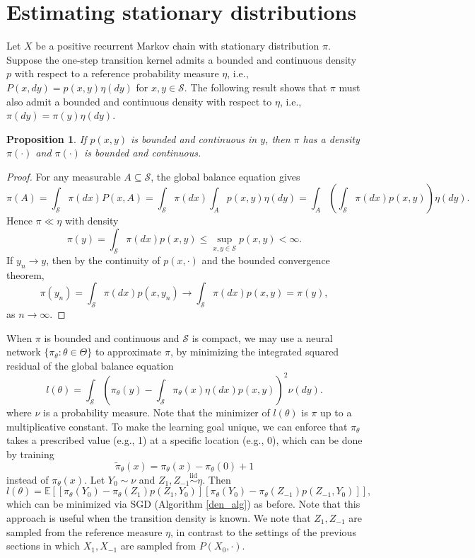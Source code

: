 \documentclass[pdflatex,sn-mathphys-ay]{sn-jnl}%
\numberwithin{equation}{section}
\newcommand\prs[1]{\left(#1\right)}
\newcommand\sbk[1]{\left[#1\right]}
\newcommand{\E}{\mathbb{E}}
\newcommand{\Scal}{\mathcal{S}}
\newcommand{\gti}{\rightarrow\infty}
\theoremstyle{thmstyleone}%
\newtheorem{proposition}[theorem]{Proposition}%
\theoremstyle{thmstyletwo}%
\theoremstyle{thmstylethree}%
\begin{document}
\section{Estimating stationary distributions}
\label{stationary_section}
Let $X$ be a positive recurrent Markov chain with stationary distribution $\pi$. Suppose the one-step transition kernel admits a bounded and continuous density $p$ with respect to a reference probability measure $\eta$, i.e., $P(x,dy)=p(x,y)\eta(dy)$ for $x,y\in\Scal$. The following result shows that $\pi$ must also admit a bounded and continuous density with respect to $\eta$, i.e., $\pi(dy)=\pi(y)\eta(dy)$. 
\begin{proposition}
\label{density_proposition}
If $p(x,y)$ is bounded and continuous in $y$, then $\pi$ has a density $\pi(\cdot)$ and $\pi(\cdot)$ is bounded and continuous.
\end{proposition}
\begin{proof}
    For any measurable $A\subseteq\Scal$, the global balance equation gives
    \[
    \pi(A)=\int_\Scal\pi(dx)P(x,A)=\int_\Scal\pi(dx)\int_A p(x,y)\eta(dy)=\int_A\prs{\int_\Scal\pi(dx)p(x,y)}\eta(dy).
    \]
    Hence $\pi\ll\eta$ with density
    \[
    \pi(y)=\int_\Scal\pi(dx)p(x,y)\leq\sup_{x,y\in\Scal}p(x,y)<\infty.
    \]
    If $y_n\rightarrow y$, then by the continuity of $p(x,\cdot)$ and the bounded convergence theorem,
    \[
    \pi(y_n)=\int_\Scal\pi(dx)p(x,y_n)\rightarrow\int_\Scal\pi(dx)p(x,y)=\pi(y),
    \]
    as $n\gti.$
\end{proof}
When $\pi$ is bounded and continuous and $\Scal$ is compact, we may use a neural network $\{\pi_\theta:\theta\in\Theta\}$ to approximate $\pi$, by minimizing the integrated squared residual of the global balance equation
\[
l(\theta)=\int_\Scal\prs{\pi_\theta(y)-\int_\Scal \pi_\theta(x)\eta(dx)p(x,y)}^2\nu(dy).
\]
where $\nu$ is a probability measure. 
Note that the minimizer of $l(\theta)$ is $\pi$ up to a multiplicative constant. To make the learning goal unique, we can enforce that $\pi_\theta$ takes a prescribed value (e.g., 1) at a specific location (e.g., 0), which can be done by training
\[
\tilde{\pi}_\theta(x)=\pi_\theta(x)-\pi_\theta(0)+1
\]
instead of $\pi_\theta(x)$.
Let $Y_0\sim\nu$ and $Z_1,Z_{-1}\stackrel{\text{iid}}{\sim}\eta$. Then
\[
l(\theta)=\E\sbk{\sbk{\pi_\theta(Y_0)-\pi_\theta(Z_1)p(Z_1,Y_0)}\sbk{\pi_\theta(Y_0)-\pi_\theta(Z_{-1})p(Z_{-1},Y_0)}},
\]
which can be minimized via SGD (Algorithm \ref{den_alg}) as before. Note that this approach is useful when the transition density is known. We note that $Z_1,Z_{-1}$ are sampled from the reference measure $\eta$, in contrast to the settings of the previous sections in which $X_1,X_{-1}$ are sampled from $P(X_0,\cdot)$.
\end{document}
